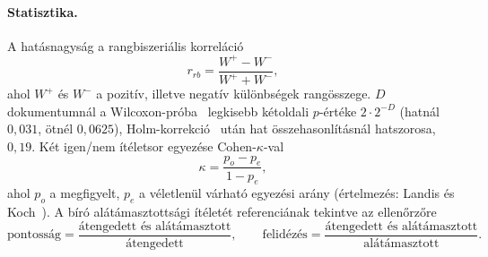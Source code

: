 \paragraph{Statisztika.}\label{app-statisztika} A hatásnagyság a rangbiszeriális
korreláció~\cite{kerby2014}
\begin{equation}
r_{rb}=\frac{W^{+}-W^{-}}{W^{+}+W^{-}},
\label{eq:rrb}
\end{equation}
ahol $W^{+}$ és $W^{-}$ a pozitív, illetve negatív különbségek rangösszege. $D$ dokumentumnál a
Wilcoxon-próba~\cite{wilcoxon1945} legkisebb kétoldali $p$-értéke $2\cdot 2^{-D}$ (hatnál $0{,}031$,
ötnél $0{,}0625$), Holm-korrekció~\cite{holm1979} után hat összehasonlításnál hatszorosa, $0{,}19$. Két
igen/nem ítéletsor egyezése Cohen-$\kappa$-val~\cite{cohen1960kappa}
\begin{equation}
\kappa=\frac{p_o-p_e}{1-p_e},
\label{eq:kappa}
\end{equation}
ahol $p_o$ a megfigyelt, $p_e$ a véletlenül várható egyezési arány (értelmezés: Landis és
Koch~\cite{landis1977}). A bíró alátámasztottsági ítéletét referenciának tekintve az ellenőrzőre
\begin{equation}
\text{pontosság}=\frac{\text{átengedett és alátámasztott}}{\text{átengedett}},\qquad
\text{felidézés}=\frac{\text{átengedett és alátámasztott}}{\text{alátámasztott}}.
\label{eq:precrec}
\end{equation}
